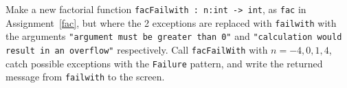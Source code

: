 Make a new factorial function \lstinline{facFailwith : n:int -> int}, as \lstinline{fac} in Assignment~\ref{fac}, but where the 2 exceptions are replaced with \lstinline{failwith} with the arguments \lstinline{"argument must be greater than 0"} and \lstinline{"calculation would result in an overflow"} respectively. Call \lstinline{facFailWith} with $n=-4,0,1,4$, catch possible exceptions with the \lstinline{Failure} pattern, and write the returned message from \lstinline{failwith} to the screen.